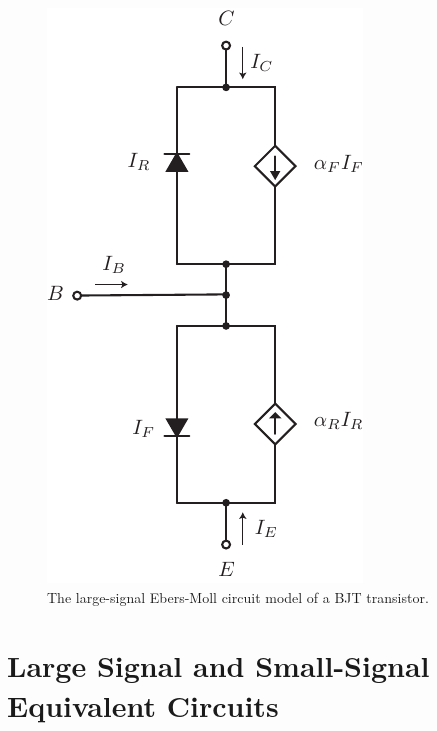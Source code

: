 \begin{figure}[tb]
\centering
\includegraphics[scale=1]{slide17_ebers_moll}
\caption{The large-signal Ebers-Moll circuit model of a BJT transistor.}
\label{fig:slide17_ebers_moll}
\end{figure}
\section{Large Signal and Small-Signal Equivalent Circuits}
